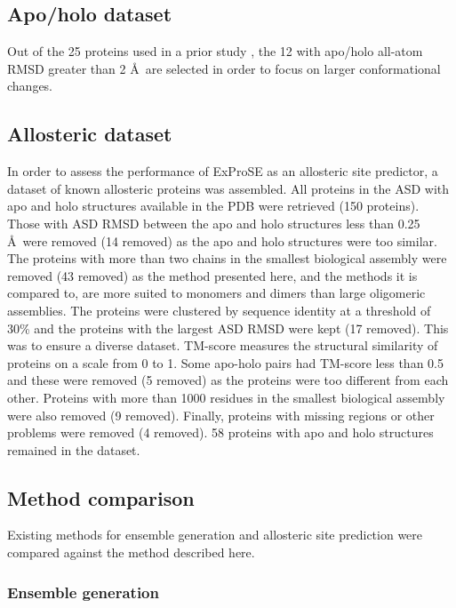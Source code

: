 \subsection{Apo/holo dataset}

Out of the 25 proteins used in a prior study \cite{Atilgan2010}, the 12 with apo/holo all-atom RMSD greater than 2 \AA\ are selected in order to focus on larger conformational changes.


\subsection{Allosteric dataset}

In order to assess the performance of ExProSE as an allosteric site predictor, a dataset of known allosteric proteins was assembled.
All proteins in the ASD with apo and holo structures available in the PDB were retrieved (150 proteins).
Those with ASD RMSD between the apo and holo structures less than 0.25 \AA\ were removed (14 removed) as the apo and holo structures were too similar.
The proteins with more than two chains in the smallest biological assembly were removed (43 removed) as the method presented here, and the methods it is compared to, are more suited to monomers and dimers than large oligomeric assemblies.
The proteins were clustered by sequence identity at a threshold of 30\% and the proteins with the largest ASD RMSD were kept (17 removed).
This was to ensure a diverse dataset.
TM-score measures the structural similarity of proteins on a scale from 0 to 1.
Some apo-holo pairs had TM-score less than 0.5 and these were removed (5 removed) as the proteins were too different from each other.
Proteins with more than 1000 residues in the smallest biological assembly were also removed (9 removed).
Finally, proteins with missing regions or other problems were removed (4 removed).
58 proteins with apo and holo structures remained in the dataset.


\subsection{Method comparison}

Existing methods for ensemble generation and allosteric site prediction were compared against the method described here.


\subsubsection{Ensemble generation}

